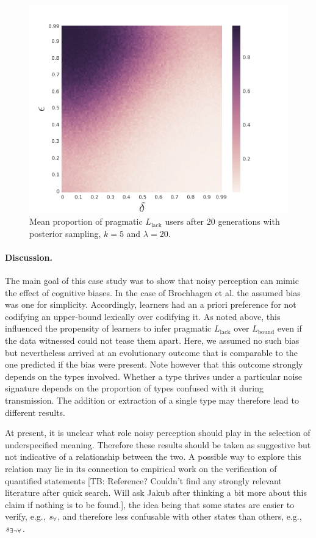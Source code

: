 \documentclass[10pt,a4paper]{article}
\newcommand{\tb}[1]{\textcolor[rgb]{.8,.33,.0}{[TB: #1]}}%
\newcommand{\state}{\ensuremath{s}\xspace}		%
\newcommand{\mystate}[1]{\ensuremath{\state_{\text{#1}}}\xspace} %
\newcommand{\ssome}{\mystate{\ensuremath{\exists\neg\forall}}}
\newcommand{\sall}{\mystate{\ensuremath{\forall}}}
\begin{document}
\begin{figure}[ht]
\centering
    \includegraphics[scale=0.33]{../code/plots/quantifiers-posterior-sampling-k5.png}
  \caption{Mean proportion of pragmatic $L_{\text{lack}}$ users after $20$ generations with posterior sampling, $k = 5$ and $\lambda = 20$.}
  \label{fig:quant}
\end{figure}


\paragraph{Discussion.} The main goal of this case study was to show that noisy perception can mimic the effect of cognitive biases. In the case of Brochhagen et al. the assumed bias was one for simplicity. Accordingly, learners had an a priori preference for not codifying an upper-bound lexically over codifying it. As noted above, this influenced the propensity of learners to infer pragmatic $L_{\text{lack}}$ over $L_{\text{bound}}$ even if the data witnessed could not tease them apart. Here, we assumed no such bias but nevertheless arrived at an evolutionary outcome that is comparable to the one predicted if the bias were present. Note however that this outcome strongly depends on the types involved. Whether a type thrives under a particular noise signature depends on the proportion of types confused with it during transmission. The addition or extraction of a single type may therefore lead to different results. 

At present, it is unclear what role noisy perception should play in the selection of underspecified meaning. Therefore these results should be taken as suggestive but not indicative of a relationship between the two. A possible way to explore this relation may lie in its connection to empirical work on the verification of quantified statements \tb{Reference? Couldn't find any strongly relevant literature after quick search. Will ask Jakub after thinking a bit more about this claim if nothing is to be found.}, the idea being that some states are easier to verify, e.g., $\sall$, and therefore less confusable with other states than others, e.g., $\ssome$. 
\end{document}
